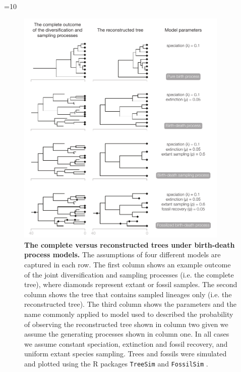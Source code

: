 \ifnum\value{num}=10{
\begin{figure}
\centering
\includegraphics[width=0.9\textwidth]{Cambridge-Elements/manuscript.R2/submitted_figs//figure5}
\caption{\footnotesize\textbf{The complete versus reconstructed trees under birth-death process models.}
The assumptions of four different models are captured in each row.
The first column shows an example outcome of the joint diversification and sampling processes (i.e. the complete tree), where diamonds represent  extant or fossil samples.
The second column shows the tree that contains sampled lineages only (i.e. the reconstructed tree). 
The third column shows the parameters and the name commonly applied to model used to described the probability of observing the reconstructed tree shown in column two given we assume the generating processes shown in column one.
In all cases we assume constant speciation, extinction and fossil recovery, and uniform extant species sampling.
Trees and fossils were simulated and plotted using the R packages \texttt{TreeSim} \citep{Stadler2011} and \texttt{FossilSim} \citep{BaridoSottani2019b}. }
\label{fig:birth-death}
\end{figure} }\else{}\fi


